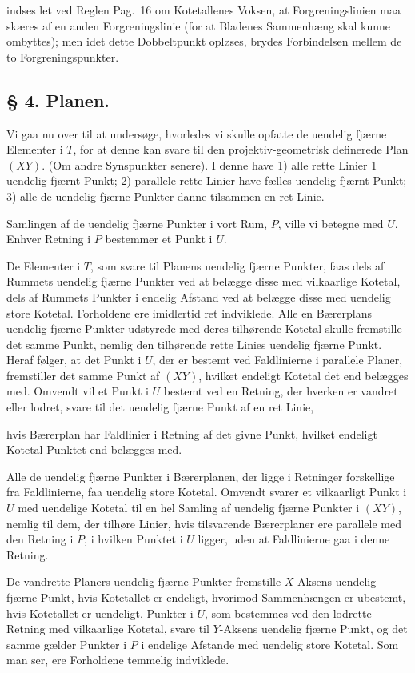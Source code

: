 \documentclass{article}
\begin{document}
indses let ved Reglen Pag.~16 om Kotetallenes Voksen, at Forgreningslinien maa skæres af en anden Forgreningslinie (for at Bladenes Sammenhæng skal kunne ombyttes); men idet dette Dobbeltpunkt opløses, brydes Forbindelsen mellem de to Forgreningspunkter.

\subsection*{§ 4. Planen.}

Vi gaa nu over til at undersøge, hvorledes vi skulle opfatte de uendelig fjærne Elementer i $T$, for at denne kan svare til den projektiv-geometrisk definerede Plan $(XY)$. (Om andre Synspunkter senere). I denne have
1) alle rette Linier 1 uendelig fjærnt Punkt;
2) parallele rette Linier have fælles uendelig fjærnt Punkt;
3) alle de uendelig fjærne Punkter danne tilsammen en ret Linie.

Samlingen af de uendelig fjærne Punkter i vort Rum, $P$, ville vi betegne med $U$. Enhver Retning i $P$ bestemmer et Punkt i $U$.

De Elementer i $T$, som svare til Planens uendelig fjærne Punkter, faas dels af Rummets uendelig fjærne Punkter ved at belægge disse med vilkaarlige Kotetal, dels af Rummets Punkter i endelig Afstand ved at belægge disse med uendelig store Kotetal. Forholdene ere imidlertid ret indviklede. Alle en Bærerplans uendelig fjærne Punkter udstyrede med deres tilhørende Kotetal skulle fremstille det samme Punkt, nemlig den tilhørende rette Linies uendelig fjærne Punkt. Heraf følger, at det Punkt i $U$, der er bestemt ved Faldlinierne i parallele Planer, fremstiller det samme Punkt af $(XY)$, hvilket endeligt Kotetal det end belægges med. Omvendt vil et Punkt i $U$ bestemt ved en Retning, der hverken er vandret eller lodret, svare til det uendelig fjærne Punkt af en ret Linie,

hvis Bærerplan har Faldlinier i Retning af det givne Punkt, hvilket endeligt Kotetal Punktet end belægges med.

Alle de uendelig fjærne Punkter i Bærerplanen, der ligge i Retninger forskellige fra Faldlinierne, faa uendelig store Kotetal. Omvendt svarer et vilkaarligt Punkt i $U$ med uendelige Kotetal til en hel Samling af uendelig fjærne Punkter i $(XY)$, nemlig til dem, der tilhøre Linier, hvis tilsvarende Bærerplaner ere parallele med den Retning i $P$, i hvilken Punktet i $U$ ligger, uden at Faldlinierne gaa i denne Retning.

De vandrette Planers uendelig fjærne Punkter fremstille $X$-Aksens uendelig fjærne Punkt, hvis Kotetallet er endeligt, hvorimod Sammenhængen er ubestemt, hvis Kotetallet er uendeligt. Punkter i $U$, som bestemmes ved den lodrette Retning med vilkaarlige Kotetal, svare til $Y$-Aksens uendelig fjærne Punkt, og det samme gælder Punkter i $P$ i endelige Afstande med uendelig store Kotetal. Som man ser, ere Forholdene temmelig indviklede.
\end{document}
